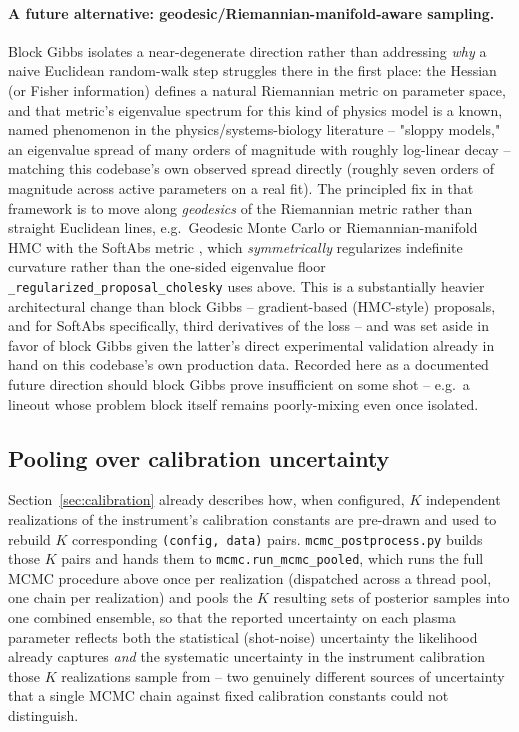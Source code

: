 \documentclass[11pt]{article}
\newcommand{\code}[1]{\texttt{#1}}
\begin{document}
\paragraph{A future alternative: geodesic/Riemannian-manifold-aware sampling.} Block Gibbs
isolates a near-degenerate direction rather than addressing \emph{why} a naive Euclidean
random-walk step struggles there in the first place: the Hessian (or Fisher information)
defines a natural Riemannian metric on parameter space, and that metric's eigenvalue
spectrum for this kind of physics model is a known, named phenomenon in the
physics/systems-biology literature -- "sloppy models," an eigenvalue spread of many orders
of magnitude with roughly log-linear decay \cite{transtrum2011,sethna2015} -- matching
this codebase's own observed spread directly (roughly seven orders of magnitude across
active parameters on a real fit). The principled fix in that framework is to move along
\emph{geodesics} of the Riemannian metric rather than straight Euclidean lines, e.g.\
Geodesic Monte Carlo \cite{byrne2013} or Riemannian-manifold HMC with the SoftAbs metric
\cite{betancourt2013}, which \emph{symmetrically} regularizes indefinite curvature rather
than the one-sided eigenvalue floor \code{\_regularized\_proposal\_cholesky} uses above.
This is a substantially heavier architectural change than block Gibbs -- gradient-based
(HMC-style) proposals, and for SoftAbs specifically, third derivatives of the loss -- and
was set aside in favor of block Gibbs given the latter's direct experimental validation
already in hand on this codebase's own production data. Recorded here as a
documented future direction should block Gibbs prove insufficient on some shot -- e.g.\ a
lineout whose problem block itself remains poorly-mixing even once isolated.

\subsection{Pooling over calibration uncertainty}\label{sec:uq-pooling}

Section~\ref{sec:calibration} already describes how, when configured, $K$ independent
realizations of the instrument's calibration constants are pre-drawn and used to rebuild
$K$ corresponding \code{(config, data)} pairs. \code{mcmc\_postprocess.py} builds those $K$
pairs and hands them to \code{mcmc.run\_mcmc\_pooled}, which runs the full MCMC procedure
above once per realization (dispatched across a thread pool, one chain per realization) and
pools the $K$ resulting sets of posterior
samples into one combined ensemble, so that the reported uncertainty on each plasma
parameter reflects both the statistical (shot-noise) uncertainty the likelihood already
captures \emph{and} the systematic uncertainty in the instrument calibration those
$K$ realizations sample from -- two genuinely different sources of uncertainty that a
single MCMC chain against fixed calibration constants could not distinguish.
\end{document}
